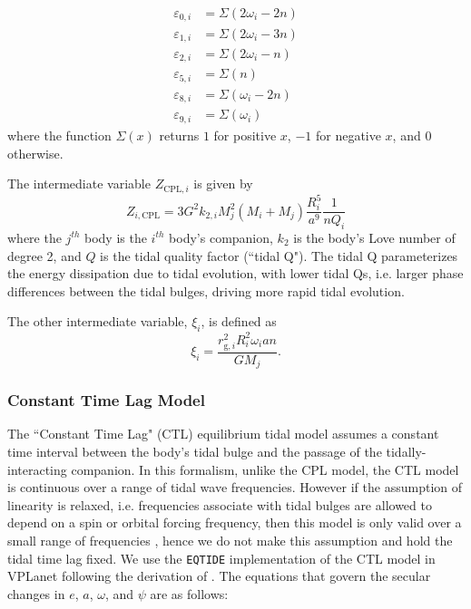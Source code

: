\documentclass[twocolumn]{aastex61}
\newcommand{\eqtide}[0]{\texttt{EQTIDE}\xspace}
\begin{document}
\begin{equation} \label{eqn:cpl:eps}
\begin{split}
\varepsilon_{0,i} & = \Sigma(2 \omega_i - 2n) \\
\varepsilon_{1,i} & = \Sigma(2 \omega_i - 3n) \\
\varepsilon_{2,i} & = \Sigma(2 \omega_i - n) \\
\varepsilon_{5,i} & = \Sigma(n) \\
\varepsilon_{8,i} & = \Sigma(\omega_i - 2n) \\
\varepsilon_{9,i} & = \Sigma(\omega_i)
\end{split}
\end{equation}
where the function $\Sigma(x)$ returns $1$ for positive $x$, $-1$ for negative $x$, and $0$ otherwise.

The intermediate variable $Z_{\mathrm{CPL},i}$ is given by
\begin{equation} \label{eqn:cpl:z}
Z_{i,\mathrm{CPL}} = 3 G^2 k_{2,i} M_j^2 (M_i + M_j) \frac{R_i^5}{a^9} \frac{1}{n Q_i}
\end{equation}
where the $j^{th}$ body is the $i^{th}$ body's companion, $k_{2}$ is the body's Love number of degree 2, and $Q$ is the tidal quality factor (``tidal Q"). The tidal Q parameterizes the energy dissipation due to tidal evolution, with lower tidal Qs, i.e. larger phase differences between the tidal bulges, driving more rapid tidal evolution.

The other intermediate variable, $\xi_i$, is defined as
\begin{equation}\label{eqn:cpl:chi}
\xi_i = \frac{r_{\mathrm{g},i}^2 R_i^2 \omega_i a n }{ G M_j}.
\end{equation}

\subsubsection{Constant Time Lag Model}

The ``Constant Time Lag" (CTL) \citep[][]{Hut1981,Leconte2010} equilibrium tidal model assumes a constant time interval between the body's tidal bulge and the passage of the tidally-interacting companion. In this formalism, unlike the CPL model, the CTL model is continuous over a range of tidal wave frequencies.  However if the assumption of linearity is relaxed, i.e. frequencies associate with tidal bulges are allowed to depend on a spin or orbital forcing frequency, then this model is only valid over a small range of frequencies \citep{Greenberg2009}, hence we do not make this assumption and hold the tidal time lag fixed. We use the \eqtide implementation of the CTL model in VPLanet following the derivation of \citet{Leconte2010}.  The equations that govern the secular changes in $e$, $a$, $\omega$, and $\psi$ are as follows:
\end{document}
